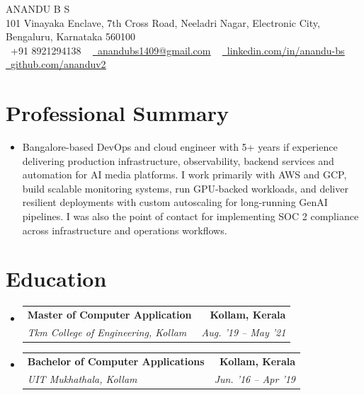 \documentclass[letterpaper,11pt]{article}
\makeatletter
\newcommand{\resumeItem}[1]{
  \item\small{
    {#1 \vspace{-2pt}}
  }
}
\newcommand{\resumeSubheading}[4]{
  \vspace{-2pt}\item
    \begin{tabular*}{1.0\textwidth}[t]{l@{\extracolsep{\fill}}r}
      \textbf{#1} & \textbf{\small #2} \\
      \textit{\small#3} & \textit{\small #4} \\
    \end{tabular*}\vspace{-11pt}
}
\newcommand{\resumeSubItem}[1]{\resumeItem{#1}\vspace{-4pt}}
\newcommand{\resumeSubHeadingListStart}{\begin{itemize}[leftmargin=0.0in, label={}]}
\newcommand{\resumeSubHeadingListEnd}{\end{itemize}}
\makeatother
\begin{document}

\begin{center}
    {\Huge \scshape ANANDU B S} \\ \vspace{1pt}
    101 Vinayaka Enclave, 7th Cross Road, Neeladri Nagar, Electronic City, Bengaluru, Karnataka 560100 \\ \vspace{1pt}
    \small \raisebox{-0.1\height}\faPhone\ +91 8921294138  ~ \href{mailto:x@gmail.com}{\raisebox{-0.2\height}\faEnvelope\  \underline{anandubs1409@gmail.com}} ~ 
    \href{https://linkedin.com/in/nithinsv}{\raisebox{-0.2\height}\faLinkedin\ \underline{linkedin.com/in/anandu-bs}}  ~
    \href{https://github.com/}{\raisebox{-0.2\height}\faGithub\ \underline{github.com/ananduv2}}
    \vspace{-8pt}
\end{center}

\section{Professional Summary}
\resumeSubHeadingListStart
  \resumeSubItem{Bangalore-based DevOps and cloud engineer with 5+ years if experience delivering production infrastructure, observability, backend services and automation for AI media platforms. I work primarily with AWS and GCP, build scalable monitoring systems, run GPU-backed workloads, and deliver resilient deployments with custom autoscaling for long-running GenAI pipelines. I was also the point of contact for implementing SOC 2 compliance across infrastructure and operations workflows.}
\resumeSubHeadingListEnd
\section{Education}
  \resumeSubHeadingListStart
    \resumeSubheading
      {Master of Computer Application }{Kollam, Kerala}
      {Tkm College of Engineering, Kollam }{Aug. '19 -- May '21}
  \resumeSubHeadingListEnd
  \resumeSubHeadingListStart
    \resumeSubheading
      {Bachelor of Computer Applications }{Kollam, Kerala}
      {UIT Mukhathala, Kollam}{Jun. '16 -- Apr '19}
  \resumeSubHeadingListEnd
\end{document}
